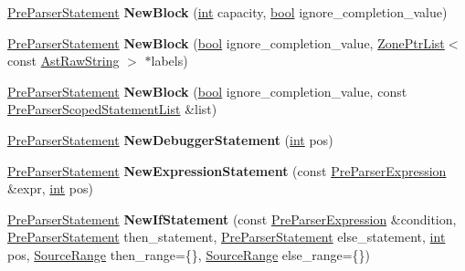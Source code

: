 \begin{DoxyCompactItemize}
\mbox{\hyperlink{classv8_1_1internal_1_1PreParserStatement}{Pre\+Parser\+Statement}} {\bfseries New\+Block} (\mbox{\hyperlink{classint}{int}} capacity, \mbox{\hyperlink{classbool}{bool}} ignore\+\_\+completion\+\_\+value)
\item 
\mbox{\label{classv8_1_1internal_1_1PreParserFactory_afa566dd4437f194ea60552cf70db66ee}} 
\mbox{\hyperlink{classv8_1_1internal_1_1PreParserStatement}{Pre\+Parser\+Statement}} {\bfseries New\+Block} (\mbox{\hyperlink{classbool}{bool}} ignore\+\_\+completion\+\_\+value, \mbox{\hyperlink{classv8_1_1internal_1_1ZoneList}{Zone\+Ptr\+List}}$<$ const \mbox{\hyperlink{classv8_1_1internal_1_1AstRawString}{Ast\+Raw\+String}} $>$ $\ast$labels)
\item 
\mbox{\label{classv8_1_1internal_1_1PreParserFactory_a142ab7b806d5accd14ed1ad21c5796c3}} 
\mbox{\hyperlink{classv8_1_1internal_1_1PreParserStatement}{Pre\+Parser\+Statement}} {\bfseries New\+Block} (\mbox{\hyperlink{classbool}{bool}} ignore\+\_\+completion\+\_\+value, const \mbox{\hyperlink{classv8_1_1internal_1_1PreParserScopedStatementList}{Pre\+Parser\+Scoped\+Statement\+List}} \&list)
\item 
\mbox{\label{classv8_1_1internal_1_1PreParserFactory_ad928315bc583c5d5408b2ba3d67d6d6c}} 
\mbox{\hyperlink{classv8_1_1internal_1_1PreParserStatement}{Pre\+Parser\+Statement}} {\bfseries New\+Debugger\+Statement} (\mbox{\hyperlink{classint}{int}} pos)
\item 
\mbox{\label{classv8_1_1internal_1_1PreParserFactory_a7e943fd484fc8c452398e87ca8b9b018}} 
\mbox{\hyperlink{classv8_1_1internal_1_1PreParserStatement}{Pre\+Parser\+Statement}} {\bfseries New\+Expression\+Statement} (const \mbox{\hyperlink{classv8_1_1internal_1_1PreParserExpression}{Pre\+Parser\+Expression}} \&expr, \mbox{\hyperlink{classint}{int}} pos)
\item 
\mbox{\label{classv8_1_1internal_1_1PreParserFactory_afa47b2a28f33323ea825b082d688cb9a}} 
\mbox{\hyperlink{classv8_1_1internal_1_1PreParserStatement}{Pre\+Parser\+Statement}} {\bfseries New\+If\+Statement} (const \mbox{\hyperlink{classv8_1_1internal_1_1PreParserExpression}{Pre\+Parser\+Expression}} \&condition, \mbox{\hyperlink{classv8_1_1internal_1_1PreParserStatement}{Pre\+Parser\+Statement}} then\+\_\+statement, \mbox{\hyperlink{classv8_1_1internal_1_1PreParserStatement}{Pre\+Parser\+Statement}} else\+\_\+statement, \mbox{\hyperlink{classint}{int}} pos, \mbox{\hyperlink{structv8_1_1internal_1_1SourceRange}{Source\+Range}} then\+\_\+range=\{\}, \mbox{\hyperlink{structv8_1_1internal_1_1SourceRange}{Source\+Range}} else\+\_\+range=\{\})

\end{DoxyCompactItemize}
